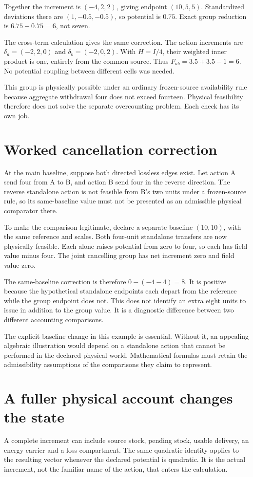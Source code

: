 Together the increment is \((-4,2,2)\), giving endpoint \((10,5,5)\). Standardized deviations there are \((1,-0.5,-0.5)\), so potential is \(0.75\). Exact group reduction is \(6.75-0.75=6\), not seven.

The cross-term calculation gives the same correction. The action increments are \(\delta_a=(-2,2,0)\) and \(\delta_b=(-2,0,2)\). With \(H=I/4\), their weighted inner product is one, entirely from the common source. Thus \(F_{ab}=3.5+3.5-1=6\). No potential coupling between different cells was needed.

This group is physically possible under an ordinary frozen-source availability rule because aggregate withdrawal four does not exceed fourteen. Physical feasibility therefore does not solve the separate overcounting problem. Each check has its own job.

\section{Worked cancellation correction}
At the main baseline, suppose both directed lossless edges exist. Let action A send four from A to B, and action B send four in the reverse direction. The reverse standalone action is not feasible from B's two units under a frozen-source rule, so its same-baseline value must not be presented as an admissible physical comparator there.

To make the comparison legitimate, declare a separate baseline \((10,10)\), with the same reference and scales. Both four-unit standalone transfers are now physically feasible. Each alone raises potential from zero to four, so each has field value minus four. The joint cancelling group has net increment zero and field value zero.

The same-baseline correction is therefore \(0-(-4-4)=8\). It is positive because the hypothetical standalone endpoints each depart from the reference while the group endpoint does not. This does not identify an extra eight units to issue in addition to the group value. It is a diagnostic difference between two different accounting comparisons.

The explicit baseline change in this example is essential. Without it, an appealing algebraic illustration would depend on a standalone action that cannot be performed in the declared physical world. Mathematical formulas must retain the admissibility assumptions of the comparisons they claim to represent.

\section{A fuller physical account changes the state}
A complete increment can include source stock, pending stock, usable delivery, an energy carrier and a loss compartment. The same quadratic identity applies to the resulting vector whenever the declared potential is quadratic. It is the actual increment, not the familiar name of the action, that enters the calculation.

